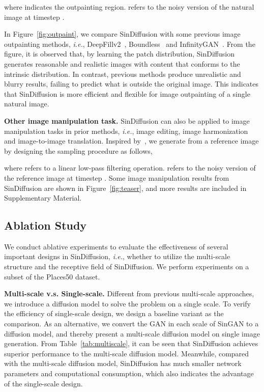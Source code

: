 \documentclass[10pt,twocolumn,letterpaper]{article}
\begin{document}
where  indicates the outpainting region.
 refers to the noisy version of the natural image  at timestep .

In Figure~\ref{fig:outpaint}, we compare SinDiffusion with some previous image outpainting methods, \emph{i.e.}, DeepFillv2~\cite{yu2019free}, Boundless~\cite{teterwak2019boundless} and InfinityGAN~\cite{lin2021infinitygan}.
From the figure, it is observed that, by learning the patch distribution, SinDiffusion generates reasonable and realistic images with content that conforms to the intrinsic distribution. 
In contrast, previous methods produce unrealistic and blurry results, failing to predict what is outside the original image.
This indicates that SinDiffusion is more efficient and flexible for image outpainting of a single natural image.

\noindent \textbf{Other image manipulation task.}
SinDiffusion can also be applied to image manipulation tasks in prior methods, \emph{i.e.}, image editing, image harmonization and image-to-image translation.
Inspired by~\cite{choi2021ilvr}, we generate from a reference image  by designing the sampling procedure as follows,

where  refers to a linear low-pass filtering operation.
 refers to the noisy version of the reference image  at timestep .
Some image manipulation results from SinDiffusion are shown in Figure~\ref{fig:teaser}, and more results are included in Supplementary Material.

\subsection{Ablation Study}
We conduct ablative experiments to evaluate the effectiveness of several important designs in SinDiffusion, \emph{i.e.}, whether to utilize the multi-scale structure and the receptive field of SinDiffusion. We perform experiments on a subset of the Places50 dataset.

\noindent \textbf{Multi-scale v.s. Single-scale.} 
Different from previous multi-scale approaches, we introduce a diffusion model to solve the problem on a single scale.
To verify the efficiency of single-scale design, we design a baseline variant as the comparison.
As an alternative, we convert the GAN in each scale of SinGAN to a diffusion model, and thereby present a multi-scale diffusion model on single image generation.
From Table~\ref{tab:multiscale}, it can be seen that SinDiffusion achieves superior performance to the multi-scale diffusion model.
Meanwhile, compared with the multi-scale diffusion model, SinDiffusion has much smaller network parameters and computational consumption, which also indicates the advantage of the single-scale design.
\end{document}
